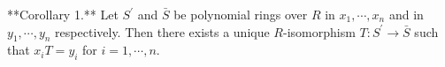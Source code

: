 **Corollary 1.** Let $S^\prime$ and $\bar{S}$ be polynomial rings over $R$ in $x_1, \cdots, x_n$ and in $y_1, \cdots, y_n$ respectively. Then there exists a unique $R$-isomorphism $T: S^\prime \to \bar{S}$ such that $x_i T = y_i$ for $i = 1, \cdots, n$.

